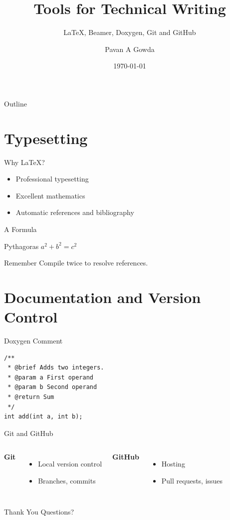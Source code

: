 \documentclass{beamer}
\title{Tools for Technical Writing}
\subtitle{LaTeX, Beamer, Doxygen, Git and GitHub}
\author{Pavan A Gowda}
\institute{NIT Jaipur}
\date{\today}
\begin{document}
\begin{frame}
  \titlepage
\end{frame}

\begin{frame}{Outline}
  \tableofcontents
\end{frame}

\section{Typesetting}
\begin{frame}{Why LaTeX?}
  \begin{itemize}
    \item<1-> Professional typesetting
    \item<2-> Excellent mathematics
    \item<3-> Automatic references and bibliography
  \end{itemize}
\end{frame}

\begin{frame}{A Formula}
  \begin{block}{Pythagoras}
    $a^2 + b^2 = c^2$
  \end{block}
  \begin{alertblock}{Remember}
    Compile twice to resolve references.
  \end{alertblock}
\end{frame}

\section{Documentation and Version Control}
\begin{frame}[fragile]{Doxygen Comment}
\begin{verbatim}
/**
 * @brief Adds two integers.
 * @param a First operand
 * @param b Second operand
 * @return Sum
 */
int add(int a, int b);
\end{verbatim}
\end{frame}

\begin{frame}{Git and GitHub}
  \begin{columns}
      \textbf{Git}
      \begin{itemize}
        \item Local version control
        \item Branches, commits
      \end{itemize}
      \textbf{GitHub}
      \begin{itemize}
        \item Hosting
        \item Pull requests, issues
      \end{itemize}
  \end{columns}
\end{frame}

\begin{frame}{Thank You}
  Questions?
\end{frame}
\end{document}
